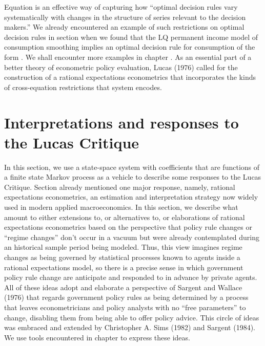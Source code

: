  Equation  is an effective way of capturing  how ``optimal decision rules vary systematically with changes in the structure of
 series relevant to the decision makers.''  We already  encountered an example of  such restrictions  on optimal decision rules in
 section  when we found that the LQ permanent income model of consumption smoothing implies an optimal decision rule
   for consumption of the form . We shall encounter  more examples  in chapter .
  As an essential part of a better theory of econometric policy evaluation,
   Lucas (1976) called for the construction of a rational expectations econometrics that incorporates  the kinds of cross-equation
restrictions  that system  encodes.
%
%
%


\section{Interpretations and responses to the Lucas Critique}\label{sec:lucascritique2}%
In this section, we use a  state-space system with coefficients that are functions of a finite state Markov process as a vehicle to describe 
some responses to the Lucas Critique.  Section  already mentioned one major response, namely,
rational expectations econometrics, an estimation and interpretation strategy now widely used in modern applied macroeconomics. 
In this section, we describe what amount to either extensions to, or  alternatives to, or elaborations of rational expectations econometrics based
on the perspective that policy rule changes or ``regime changes''  don't occur in a vacuum but were already
contemplated during an historical 
sample period being modeled.  Thus, this view imagines  regime changes as being  governed by statistical processes known to agents inside a rational expectations model, so there is a precise sense in which government policy rule change
are anticipate and  responded to in advance by private agents.
All of these ideas adopt and elaborate a perspective of Sargent and Wallace (1976) that regards government policy rules  as being
determined by a  process that  leaves  econometricians and policy analysts with no ``free parameters'' to change,
disabling them from being able to offer policy advice.  This circle of ideas was embraced and extended by
 Christopher A. Sims (1982) and Sargent (1984).
 We use tools encountered in chapter  to  express these ideas.   
%
%


